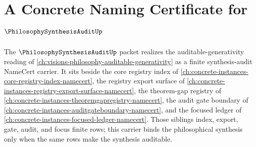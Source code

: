 \chapter{A Concrete Naming Certificate for $\PhilosophySynthesisAuditUp$}
\label{ch:concrete-instances-philosophy-synthesis-audit-namecert}

The $\PhilosophySynthesisAuditUp$ packet realizes the auditable-generativity reading of \autoref{ch:visions-philosophy-auditable-generativity} as a finite synthesis-audit NameCert carrier. It sits beside the core registry index of \autoref{ch:concrete-instances-core-registry-index-namecert}, the registry export surface of \autoref{ch:concrete-instances-registry-export-surface-namecert}, the theorem-gap registry of \autoref{ch:concrete-instances-theoremgapregistry-namecert}, the audit gate boundary of \autoref{ch:concrete-instances-auditgateboundary-namecert}, and the focused ledger of \autoref{ch:concrete-instances-focused-ledger-namecert}. Those siblings index, export, gate, audit, and focus finite rows; this carrier binds the philosophical synthesis only when the same rows make the synthesis auditable.

